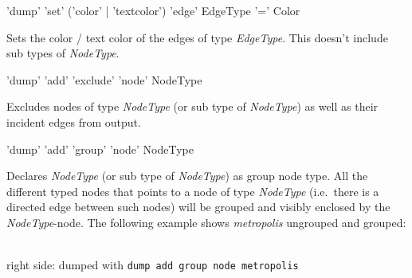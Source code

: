 \begin{rail}
  'dump' 'set' ('color' | 'textcolor') 'edge' EdgeType '=' Color
\end{rail}
Sets the color / text color of the edges of type \emph{EdgeType}. This doesn't include sub types of \emph{NodeType}.

\begin{rail}
  'dump' 'add' 'exclude' 'node' NodeType
\end{rail}
Excludes nodes of type \emph{NodeType} (or sub type of \emph{NodeType}) as well as their incident edges from output.

\begin{rail}
  'dump' 'add' 'group' 'node' NodeType
\end{rail}
Declares \emph{NodeType} (or sub type of \emph{NodeType}) as group node type. All the different typed nodes that points to a node of type \emph{NodeType} (i.e.\ there is a directed edge between such nodes) will be grouped and visibly enclosed by the \emph{NodeType}-node.
The following example shows \emph{metropolis} ungrouped and grouped:
\begin{center}
    \hfill {}\\
  {\small right side: dumped with \texttt{dump add group node metropolis}}
\end{center}

